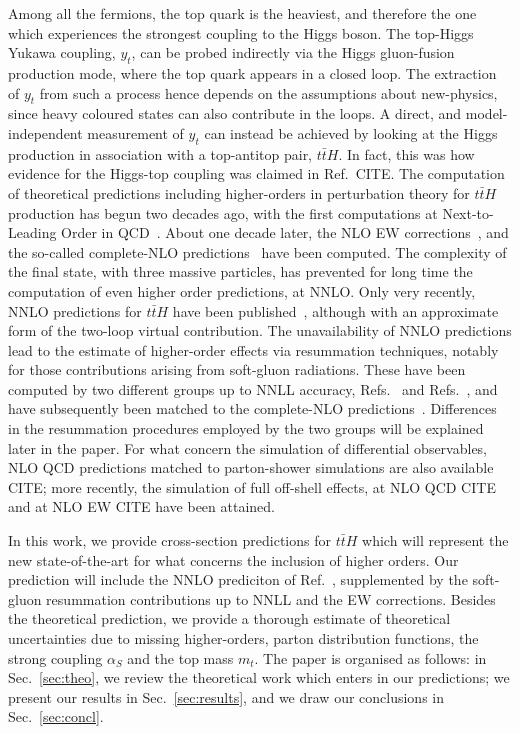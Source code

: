 \documentclass[a4paper,usenames,dvipsnames,11pt]{article}
\newcommand\alphas{\alpha_S}
\newcommand\yt{y_t}
\newcommand\tth{t\bar t H}
\newcommand{\mt}{m_{t}}
\begin{document}
Among all the fermions, the top quark is the heaviest, and therefore the one which experiences the strongest coupling to the Higgs boson. The
top-Higgs Yukawa coupling, $\yt$,
can be probed indirectly via the Higgs gluon-fusion production mode, where the top quark appears in a closed loop. The extraction
of $\yt$ from such a process hence depends on the assumptions about new-physics, since heavy coloured states can also contribute in the loops.
A direct, and model-independent measurement of $\yt$ can instead be achieved by looking at the Higgs production in association with a top-antitop pair,
$\tth$. In fact, this was how evidence for the Higgs-top coupling was claimed in Ref.~CITE. 
The computation of theoretical predictions including higher-orders in perturbation theory for $\tth$ production has begun two decades
ago, with the first computations at Next-to-Leading Order in QCD~\cite{Reina:2001sf,Reina:2001bc,Dawson:2002tg}. About one decade later, the
NLO EW corrections~\cite{Frixione:2014qaa,Zhang:2014gcy,Frixione:2015zaa}, and the so-called complete-NLO predictions~\cite{Frederix:2018nkq} have been computed. The complexity of the final state, with three massive particles, has prevented for long time the computation of even higher order predictions, at NNLO.
Only very recently, NNLO predictions for $\tth$ have been published~\cite{Catani:2022mfv}, although with an approximate form of the two-loop virtual contribution.
The unavailability of NNLO predictions lead to the estimate of higher-order effects via resummation techniques, notably for those contributions
arising from soft-gluon radiations. These have been computed  by two different groups up to NNLL accuracy, Refs.~\cite{Broggio:2015lya,Broggio:2016lfj} and Refs.~\cite{Kulesza:2015vda,Kulesza:2017ukk}, and have subsequently been matched to the complete-NLO 
predictions~\cite{ Kulesza:2018tqz,Broggio:2019ewu,Kulesza:2020nfh}. Differences in the resummation procedures employed by the two groups will be explained later in the paper.
For what concern the simulation of differential observables, NLO QCD predictions matched to parton-shower simulations are also available CITE; more recently,
the simulation of full off-shell effects, at NLO QCD CITE and at NLO EW CITE have been attained.

In this work, we provide cross-section predictions for $\tth$ which will represent the new state-of-the-art
for what concerns the inclusion of higher orders. Our prediction
will include the NNLO prediciton of Ref.~\cite{Catani:2022mfv}, supplemented by the soft-gluon resummation contributions up to NNLL and the EW corrections.
Besides the theoretical prediction, we provide a thorough estimate of theoretical uncertainties due to missing higher-orders, parton distribution
functions, the strong coupling $\alphas$ and the top mass $\mt$. The paper is organised as follows: in Sec.~\ref{sec:theo}, we review
the theoretical work which enters in our predictions; we present our results in Sec.~\ref{sec:results}, and we draw our conclusions in Sec.~\ref{sec:concl}.
\end{document}

